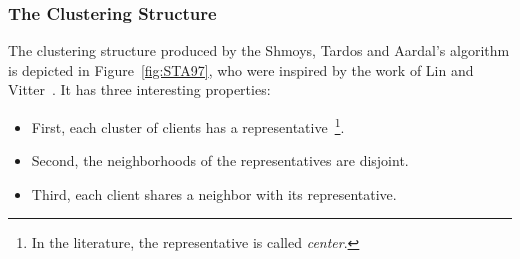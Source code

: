 \documentclass[oneside,final]{ucr}
\def\ssp{\def\baselinestretch{1.0}\large\normalsize}
\begin{document}
\subsubsection{The Clustering Structure}
The clustering structure produced by the Shmoys, Tardos and
Aardal's algorithm is depicted in Figure~\ref{fig:STA97},
who were inspired by the work of Lin and
Vitter~\cite{LinV92}. It has three interesting properties:
\begin{itemize}
\item First, each cluster of clients has a
  representative~\footnote{In the literature, the
    representative is called \emph{center}.}.
\item Second, the neighborhoods of the representatives are
  disjoint.
\item Third, each client shares a neighbor with its
  representative.
\end{itemize}
%
%
\ssp
\end{document}
